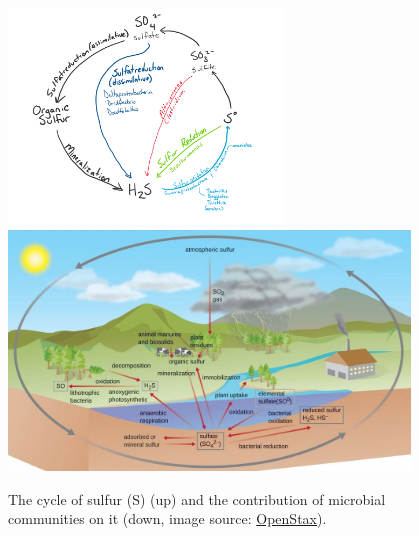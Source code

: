       \begin{figure}[h]
         \centering
         \includegraphics[width=0.65\textwidth]{figures/Sulfur_Cycle_for_Hydrothermal_Vents.png}
         \includegraphics[width=0.95\textwidth]{figures/sulfur_village.png}
         \caption[The cycle of S and the role of microbial communiites]{
            The cycle of sulfur (S) (up) and the contribution of microbial communities on it (down, image source: \href{https://openstax.org/resources/3002d0fba25221d24455917117482a079a11f321}{OpenStax}).
         }
         \label{fig:co2}
      \end{figure}

